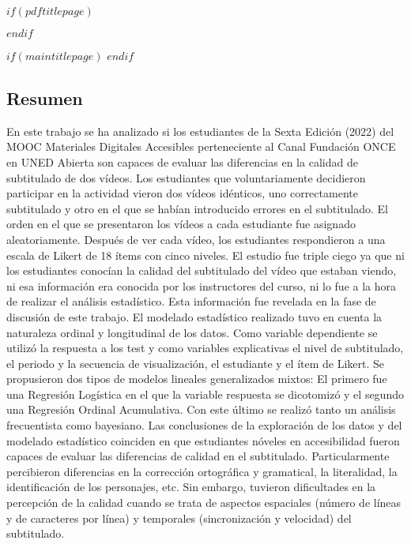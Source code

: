 \frontmatter


$if(pdftitlepage)$

\cleardoublepage
$endif$

$if(maintitlepage)$
$endif$


\makeatletter
\begin{center} %
\chapter*{Resumen} %
\end{center}   
\makeatother
En este trabajo se ha analizado si los estudiantes de la Sexta Edición (2022) del MOOC Materiales Digitales Accesibles
perteneciente al Canal Fundación \nobreak ONCE en UNED Abierta son capaces de evaluar las diferencias
en la calidad de subtitulado de dos vídeos. Los estudiantes que voluntariamente decidieron
participar en la actividad vieron dos vídeos idénticos, uno correctamente subtitulado y otro
en el que se habían introducido errores en el subtitulado. El orden en el que se presentaron los vídeos a cada estudiante
fue asignado aleatoriamente. Después de ver cada vídeo, los estudiantes respondieron a una escala de Likert de 18
ítems con cinco niveles. El estudio fue triple ciego ya que ni los estudiantes conocían la calidad
del subtitulado del vídeo que estaban viendo, ni esa información era conocida por los instructores del curso, ni lo fue a la
hora de realizar el análisis estadístico. Esta información fue revelada en la fase de discusión de este trabajo.
El modelado estadístico realizado tuvo en cuenta la naturaleza ordinal y longitudinal de los datos. Como variable dependiente se
utilizó la respuesta a los test y como variables explicativas el nivel de subtitulado, el periodo y la secuencia de visualización,
el estudiante y el ítem de Likert. Se propusieron dos tipos de modelos lineales generalizados mixtos:
El primero fue una Regresión Logística en el que la variable
respuesta se dicotomizó y el segundo una Regresión Ordinal Acumulativa. Con este último se realizó tanto un análisis frecuentista
como bayesiano. Las conclusiones de la exploración de los datos y del modelado estadístico 
coinciden en que estudiantes nóveles en accesibilidad
fueron capaces de evaluar las diferencias de calidad en el subtitulado. Particularmente percibieron diferencias en la
corrección ortográfica y gramatical, la literalidad, la identificación de los personajes, etc. Sin embargo, tuvieron dificultades en
la percepción de la calidad cuando se trata de aspectos espaciales (número de líneas y de caracteres por línea)
y temporales (sincronización y velocidad) del subtitulado.

